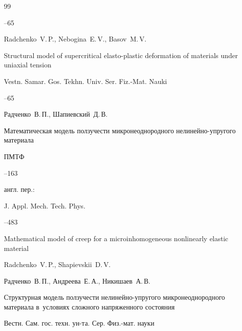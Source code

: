 \begin{thebibliography}{99}


--65



\misctransl 

\by Radchenko~V.\,P., Nebogina~E.\,V., Basov~M.\,V.

\paper Structural model of supercritical elasto-plastic deformation of materials under uniaxial tension

\jour Vestn. Samar. Gos. Tekhn. Univ. Ser. Fiz.-Mat. Nauki



--65




\by Радченко~В.\,П., Шапиевский~Д.\,В.

\paper Математическая модель ползучести микронеоднородного нелинейно-упругого материала

\jour ПМТФ




--163

\transl англ. пер.:~

\jour J. Appl. Mech. Tech. Phys.




--483

\paper Mathematical model of creep for a microinhomogeneous nonlinearly elastic material

\by  Radchenko~V.\,P., Shapievskii~D.\,V.









\by Радченко~В.\,П., Андреева~Е.\,А., Никишаев~А.\,В.

\paper Структурная модель ползучести нелинейно-упругого микронеоднородного материала в~условиях сложного напряженного состояния

\jour Вестн. Сам. гос. техн. ун-та. Сер. Физ.-мат. науки


\end{thebibliography}
